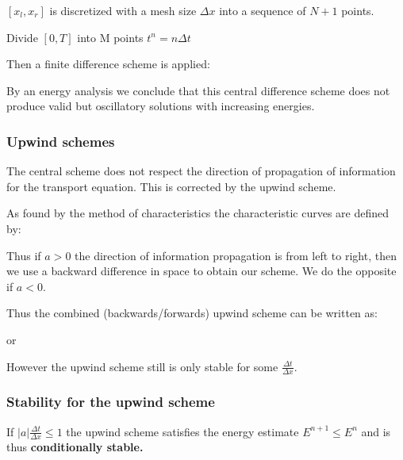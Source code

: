 \documentclass[10pt,a4paper]{scrartcl}
\begin{document}
\begin{multicols*}{3}
$[x_l,x_r]$ is discretized with a mesh size $\Delta x$ into a sequence of $N+1$ points.

Divide $[0,T]$ into M points $t^n=n\Delta t$

Then a finite difference scheme is applied:


By an energy analysis we conclude that this central difference scheme does not produce valid but oscillatory solutions with increasing energies.

\subsubsection{Upwind schemes}

The central scheme does not respect the direction of propagation of information for the transport equation. This is corrected by the upwind scheme.

As found by the method of characteristics the characteristic curves are defined by:
 

Thus if $a>0$ the direction of information propagation is from left to right, then we use a backward difference in space to obtain our scheme. We do the opposite if $a<0$.


Thus the combined (backwards/forwards) upwind scheme can be written as:


or


However the upwind scheme still is only stable for some $\frac{\Delta t}{\Delta x}.$

\subsubsection{Stability for the upwind scheme}

If $|a|\frac{\Delta t}{\Delta x}\leq 1$ the upwind scheme satisfies the energy estimate $E^{n+1}\leq E^n$ and is thus \textbf{conditionally stable.}











\end{multicols*}
\end{document}
